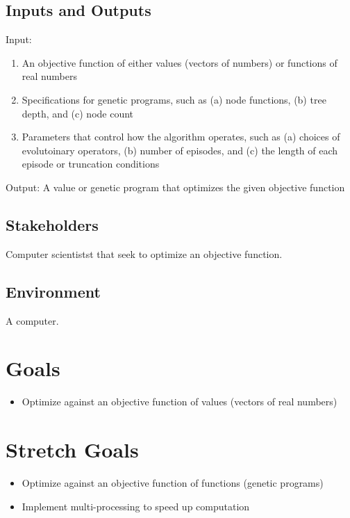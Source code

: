 \documentclass{article}
\begin{document}
\subsection{Inputs and Outputs}

Input: 
\begin{enumerate}
    \item An objective function of either values (vectors of numbers) or functions of real numbers
    \item Specifications for genetic programs, such as (a) node functions, (b) tree depth, and (c) node count
    \item Parameters that control how the algorithm operates, such as (a) choices of evolutoinary operators, (b) number of episodes, and (c) the length of each episode or truncation conditions
\end{enumerate}


Output: A value or genetic program that optimizes the given objective function


\subsection{Stakeholders}
Computer scientistst that seek to optimize an objective function.

\subsection{Environment}

A computer.

\section{Goals}

\begin{itemize}
    \item Optimize against an objective function of values (vectors of real numbers)
\end{itemize}

\section{Stretch Goals}

\begin{itemize}
    \item Optimize against an objective function of functions (genetic programs)
    \item Implement multi-processing to speed up computation 
\end{itemize}
\end{document}
